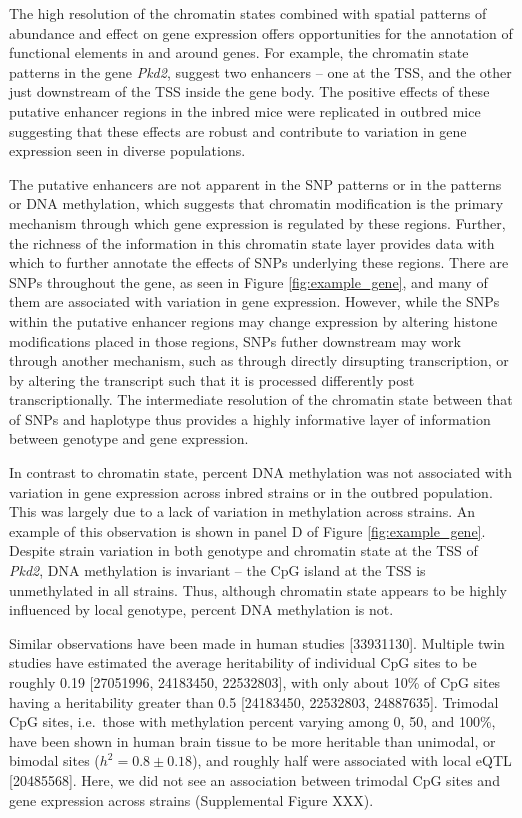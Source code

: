 \documentclass[10pt,letterpaper]{article}
\begin{document}
The high resolution of the chromatin states combined with spatial
patterns of abundance and effect on gene expression offers opportunities
for the annotation of functional elements in and around genes. For
example, the chromatin state patterns in the gene \textit{Pkd2}, suggest
two enhancers -- one at the TSS, and the other just downstream of the
TSS inside the gene body. The positive effects of these putative
enhancer regions in the inbred mice were replicated in outbred mice
suggesting that these effects are robust and contribute to variation in
gene expression seen in diverse populations.

The putative enhancers are not apparent in the SNP patterns or in the
patterns or DNA methylation, which suggests that chromatin modification
is the primary mechanism through which gene expression is regulated by
these regions. Further, the richness of the information in this
chromatin state layer provides data with which to further annotate the
effects of SNPs underlying these regions. There are SNPs throughout the
gene, as seen in Figure \ref{fig:example_gene}, and many of them are
associated with variation in gene expression. However, while the SNPs
within the putative enhancer regions may change expression by altering
histone modifications placed in those regions, SNPs futher downstream
may work through another mechanism, such as through directly dirsupting
transcription, or by altering the transcript such that it is processed
differently post transcriptionally. The intermediate resolution of the
chromatin state between that of SNPs and haplotype thus provides a
highly informative layer of information between genotype and gene
expression.

In contrast to chromatin state, percent DNA methylation was not
associated with variation in gene expression across inbred strains or in
the outbred population. This was largely due to a lack of variation in
methylation across strains. An example of this observation is shown in
panel D of Figure \ref{fig:example_gene}. Despite strain variation in
both genotype and chromatin state at the TSS of \textit{Pkd2}, DNA
methylation is invariant -- the CpG island at the TSS is unmethylated in
all strains. Thus, although chromatin state appears to be highly
influenced by local genotype, percent DNA methylation is not.

Similar observations have been made in human studies {[}33931130{]}.
Multiple twin studies have estimated the average heritability of
individual CpG sites to be roughly 0.19 {[}27051996, 24183450,
22532803{]}, with only about 10\% of CpG sites having a heritability
greater than 0.5 {[}24183450, 22532803, 24887635{]}. Trimodal CpG sites,
i.e.~those with methylation percent varying among 0, 50, and 100\%, have
been shown in human brain tissue to be more heritable than unimodal, or
bimodal sites (\(h^2 = 0.8 \pm 0.18\)), and roughly half were associated
with local eQTL {[}20485568{]}. Here, we did not see an association
between trimodal CpG sites and gene expression across strains
(Supplemental Figure XXX).
\end{document}
